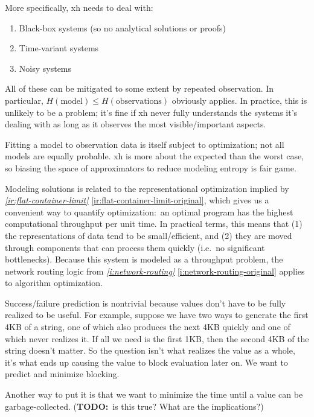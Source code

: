\documentclass{report}
\newcommand{\refboth}[1]{{\em \ref{#1}} \ref{#1-original}}
\begin{document}
  More specifically, xh needs to deal with:

\begin{enumerate}
\item{Black-box systems (so no analytical solutions or proofs)}
\item{Time-variant systems}
\item{Noisy systems}
\end{enumerate}

  All of these can be mitigated to some extent by repeated observation. In
  particular, $H(\textrm{model}) \le H(\textrm{observations})$ obviously
  applies. In practice, this is unlikely to be a problem; it's fine if xh never
  fully understands the systems it's dealing with as long as it observes the
  most visible/important aspects.

  Fitting a model to observation data is itself subject to optimization; not
  all models are equally probable. xh is more about the expected than the worst
  case, so biasing the space of approximators to reduce modeling entropy is
  fair game.

  Modeling solutions is related to the representational optimization implied by
  \refboth{ir:flat-container-limit}, which gives us a convenient way to
  quantify optimization:~an optimal program has the highest computational
  throughput per unit time. In practical terms, this means that (1) the
  representations of data tend to be small/efficient, and (2) they are moved
  through components that can process them quickly (i.e.~no significant
  bottlenecks). Because this system is modeled as a throughput problem, the
  network routing logic from \refboth{i:network-routing} applies to algorithm
  optimization.

  Success/failure prediction is nontrivial because values don't have to be
  fully realized to be useful. For example, suppose we have two ways to
  generate the first 4KB of a string, one of which also produces the next 4KB
  quickly and one of which never realizes it. If all we need is the first 1KB,
  then the second 4KB of the string doesn't matter. So the question isn't what
  realizes the value as a whole, it's what ends up causing the value to block
  evaluation later on. We want to predict and minimize blocking.

  Another way to put it is that we want to minimize the time until a value can
  be garbage-collected. ({\bf TODO:}~is this true? What are the implications?)
\end{document}
